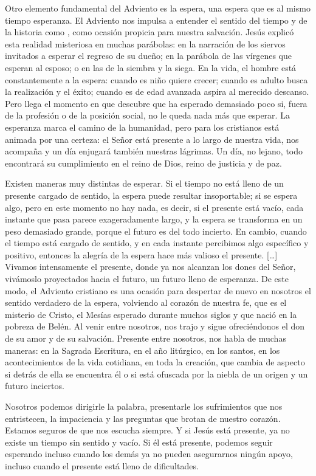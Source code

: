 \begin{introstyle}
	Otro elemento fundamental del Adviento es la espera, una espera que es al mismo tiempo esperanza. El Adviento nos impulsa a entender el sentido del tiempo y de la historia como , como ocasión propicia para nuestra salvación. Jesús explicó esta realidad misteriosa en muchas parábolas: en la narración de los siervos invitados a esperar el regreso de su dueño; en la parábola de las vírgenes que esperan al esposo; o en las de la siembra y la siega. En la vida, el hombre está constantemente a la espera: cuando es niño quiere crecer; cuando es adulto busca la realización y el éxito; cuando es de edad avanzada aspira al merecido descanso. Pero llega el momento en que descubre que ha esperado demasiado poco si, fuera de la profesión o de la posición social, no le queda nada más que esperar. La esperanza marca el camino de la humanidad, pero para los cristianos está animada por una certeza: el Señor está presente a lo largo de nuestra vida, nos acompaña y un día enjugará también nuestras lágrimas. Un día, no lejano, todo encontrará su cumplimiento en el reino de Dios, reino de justicia y de paz.
	
	Existen maneras muy distintas de esperar. Si el tiempo no está lleno de un presente cargado de sentido, la espera puede resultar insoportable; si se espera algo, pero en este momento no hay nada, es decir, si el presente está vacío, cada instante que pasa parece exageradamente largo, y la espera se transforma en un peso demasiado grande, porque el futuro es del todo incierto. En cambio, cuando el tiempo está cargado de sentido, y en cada instante percibimos algo específico y positivo, entonces la alegría de la espera hace más valioso el presente. {[}\ldots{}{]} Vivamos intensamente el presente, donde ya nos alcanzan los dones del Señor, vivámoslo proyectados hacia el futuro, un futuro lleno de esperanza. De este modo, el Adviento cristiano es una ocasión para despertar de nuevo en nosotros el sentido verdadero de la espera, volviendo al corazón de nuestra fe, que es el misterio de Cristo, el Mesías esperado durante muchos siglos y que nació en la pobreza de Belén. Al venir entre nosotros, nos trajo y sigue ofreciéndonos el don de su amor y de su salvación. Presente entre nosotros, nos habla de muchas maneras: en la Sagrada Escritura, en el año litúrgico, en los santos, en los acontecimientos de la vida cotidiana, en toda la creación, que cambia de aspecto si detrás de ella se encuentra él o si está ofuscada por la niebla de un origen y un futuro inciertos.
	
	Nosotros podemos dirigirle la palabra, presentarle los sufrimientos que nos entristecen, la impaciencia y las preguntas que brotan de nuestro corazón. Estamos seguros de que nos escucha siempre. Y si Jesús está presente, ya no existe un tiempo sin sentido y vacío. Si él está presente, podemos seguir esperando incluso cuando los demás ya no pueden asegurarnos ningún apoyo, incluso cuando el presente está lleno de dificultades.
	

\end{introstyle}
